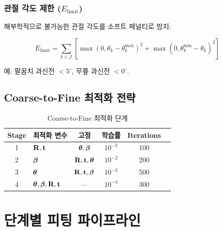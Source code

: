 \documentclass[11pt, a4paper]{report}
\begin{document}
\subsection{관절 각도 제한 ($E_{\text{limit}}$)}

해부학적으로 불가능한 관절 각도를 소프트 페널티로 방지:

\begin{equation}
E_{\text{limit}} = \sum_{k \in \mathcal{J}} \left[
  \max(0, \theta_k - \theta_k^{\max})^2 + \max(0, \theta_k^{\min} - \theta_k)^2
\right]
\end{equation}

예: 팔꿈치 과신전 $< 5^\circ$, 무릎 과신전 $< 0^\circ$.


\section{Coarse-to-Fine 최적화 전략}

\begin{table}[H]
\centering
\caption{Coarse-to-Fine 최적화 단계}
\renewcommand{\arraystretch}{1.3}
\begin{tabular}{clcccc}
\toprule
\textbf{Stage} & \textbf{최적화 변수} & \textbf{고정} & \textbf{학습률} & \textbf{Iterations} \\
\midrule
1 & $\mathbf{R}, \mathbf{t}$ & $\bm{\theta}, \bm{\beta}$ & $10^{-2}$ & 100 \\
2 & $\bm{\beta}$ & $\mathbf{R}, \mathbf{t}, \bm{\theta}$ & $10^{-2}$ & 200 \\
3 & $\bm{\theta}$ & $\mathbf{R}, \mathbf{t}, \bm{\beta}$ & $10^{-3}$ & 500 \\
4 & $\bm{\theta}, \bm{\beta}, \mathbf{R}, \mathbf{t}$ & --- & $10^{-4}$ & 300 \\
\bottomrule
\end{tabular}
\end{table}


\chapter{단계별 피팅 파이프라인}
\label{ch:pipeline}
\end{document}
